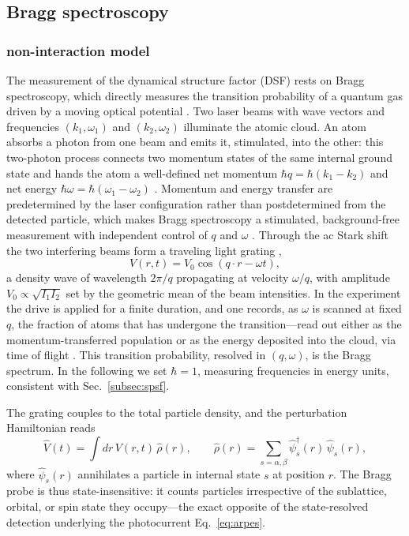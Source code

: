 \documentclass[onecolumn,aps,prl,superscriptaddress,longbibliography]{revtex4-2}
\begin{document}
\subsection{Bragg spectroscopy}\label{subsec:bragg}
\subsubsection{non-interaction model}\label{subsubsec:bragg_nonint}

The measurement of the dynamical structure factor (DSF) rests on Bragg spectroscopy, which directly measures the transition probability of a quantum gas driven by a moving optical potential \cite{stenger1999,rey2005}. Two laser beams with wave vectors and frequencies $(k_1,\omega_1)$ and $(k_2,\omega_2)$ illuminate the atomic cloud. An atom absorbs a photon from one beam and emits it, stimulated, into the other: this two-photon process connects two momentum states of the same internal ground state and hands the atom a well-defined net momentum $\hbar q=\hbar(k_1-k_2)$ and net energy $\hbar\omega=\hbar(\omega_1-\omega_2)$ \cite{stenger1999}. Momentum and energy transfer are predetermined by the laser configuration rather than postdetermined from the detected particle, which makes Bragg spectroscopy a stimulated, background-free measurement with independent control of $q$ and $\omega$ \cite{stenger1999}. Through the ac Stark shift the two interfering beams form a traveling light grating \cite{rey2005},
\begin{equation}\label{eq:bragg_drive}
  V(r,t) = V_0\cos(q\cdot r-\omega t),
\end{equation}
a density wave of wavelength $2\pi/q$ propagating at velocity $\omega/q$, with amplitude $V_0\propto\sqrt{I_1 I_2}$ set by the geometric mean of the beam intensities. In the experiment the drive is applied for a finite duration, and one records, as $\omega$ is scanned at fixed $q$, the fraction of atoms that has undergone the transition---read out either as the momentum-transferred population or as the energy deposited into the cloud, via time of flight \cite{stenger1999,rey2005}. This transition probability, resolved in $(q,\omega)$, is the Bragg spectrum. In the following we set $\hbar=1$, measuring frequencies in energy units, consistent with Sec.~\ref{subsec:spsf}.

The grating couples to the total particle density, and the perturbation Hamiltonian reads
\begin{equation}\label{eq:bragg_pert}
  \hat V(t) = \int dr\, V(r,t)\,\hat\rho(r),
  \qquad
  \hat\rho(r) = \sum_{s=\alpha,\beta}\hat\psi_s^\dagger(r)\,\hat\psi_s(r),
\end{equation}
where $\hat\psi_s(r)$ annihilates a particle in internal state $s$ at position $r$. The Bragg probe is thus state-insensitive: it counts particles irrespective of the sublattice, orbital, or spin state they occupy---the exact opposite of the state-resolved detection underlying the photocurrent Eq.~\eqref{eq:arpes}.
\end{document}
